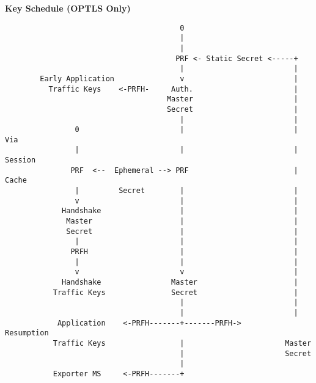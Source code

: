 \documentclass[helvetica]{seminar}
\newcommand{\heading}[1]{%
  \begin{center} 
    \large\bf 
    #1 
  \end{center} 
  \vspace{.4 in}}
\begin{document}
\begin{slide}
\heading{Key Schedule (OPTLS Only)}

\vspace{-.45in}
{\tiny
\begin{verbatim}
                                        0
                                        |                         
                                        |                         
                                       PRF <- Static Secret <-----+
                                        |                         |
        Early Application               v                         |
          Traffic Keys    <-PRFH-     Auth.                       |
                                     Master                       |
                                     Secret                       |
                                        |                         |
                0                       |                         | Via
                |                       |                         | Session
               PRF  <--  Ephemeral --> PRF                        | Cache
                |         Secret        |                         |
                v                       |                         |
             Handshake                  |                         |
              Master                    |                         |
              Secret                    |                         |
                |                       |                         |
               PRFH                     |                         |
                |                       |                         |
                v                       v                         |
             Handshake                Master                      |
           Traffic Keys               Secret                      |
                                        |                         |
                                        |                         |
            Application    <-PRFH-------+-------PRFH->        Resumption        
           Traffic Keys                 |                       Master
                                        |                       Secret  
                                        |
           Exporter MS     <-PRFH-------+
\end{verbatim}
}
\end{slide}
\end{document}
